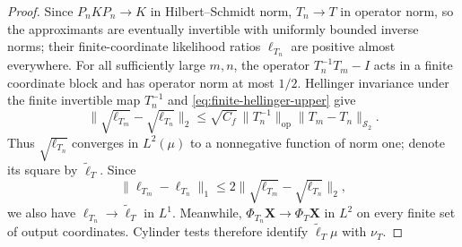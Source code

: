 \begin{proof}
Since $P_nKP_n\to K$ in Hilbert--Schmidt norm, $T_n\to T$ in
operator norm, so the approximants are eventually invertible with uniformly
bounded inverse norms; their finite-coordinate likelihood ratios
\(\ell_{T_n}\) are positive almost everywhere.
For all sufficiently large $m,n$, the operator $T_n^{-1}T_m-I$
acts in a finite coordinate block and has operator norm at most $1/2$.
Hellinger invariance under the finite invertible map $T_n^{-1}$ and
\eqref{eq:finite-hellinger-upper} give
\begin{equation}
 \|\sqrt{\ell_{T_m}}-\sqrt{\ell_{T_n}}\|_2
 \le\sqrt{C_f}\,\|T_n^{-1}\|_{\mathrm{op}}
                    \|T_m-T_n\|_{\mathcal S_2}.
\end{equation}
Thus \(\sqrt{\ell_{T_n}}\) converges in $L^2(\mu)$ to a nonnegative
function of norm one; denote its square by $\widetilde\ell_T$.  Since
\[
 \|\ell_{T_m}-\ell_{T_n}\|_1
 \le2\|\sqrt{\ell_{T_m}}-\sqrt{\ell_{T_n}}\|_2,
\]
we also have \(\ell_{T_n}\to\widetilde\ell_T\) in \(L^1\).  Meanwhile,
\(\Phi_{T_n}\mathbf X\to\Phi_T\mathbf X\) in \(L^2\) on every finite set
of output coordinates.  Cylinder tests therefore identify
$\widetilde\ell_T\mu$ with $\nu_T$.


\end{proof}
